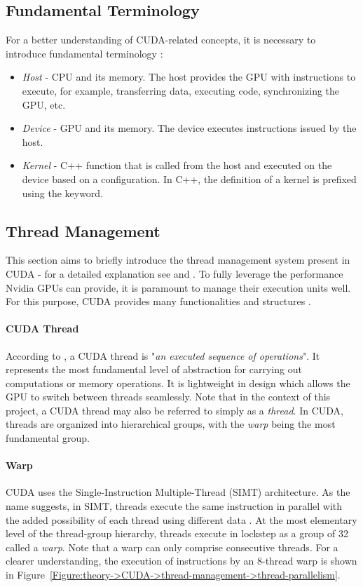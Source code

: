 \subsection{Fundamental Terminology}
For a better understanding of CUDA-related concepts, it is necessary to introduce fundamental terminology \cite{Ruetsch2008, Cejka2022}:
\begin{itemize}
	\item \textit{Host} - CPU and its memory.
The host provides the GPU with instructions to execute, for example, transferring data, executing code, synchronizing the GPU, etc.
	\item \textit{Device} - GPU and its memory.
The device executes instructions issued by the host.
	\item \textit{Kernel} - C++ function that is called from the host and executed on the device based on a configuration.
In C++, the definition of a kernel is prefixed using the  keyword.
\end{itemize}


\subsection{Thread Management}\label{Subsection:theory->CUDA->thread-management}
This section aims to briefly introduce the thread management system present in CUDA - for a detailed explanation see  \cite{Cejka2020} and  \cite{Cejka2022}.
To fully leverage the performance Nvidia GPUs can provide, it is paramount to manage their execution units well.
For this purpose, CUDA provides many functionalities and structures \cite{NVIDIADecember2022}.

\paragraph{CUDA Thread} According to  \cite{NVIDIADecember2022}, a CUDA thread is "\textit{an executed sequence of operations}".
It represents the most fundamental level of abstraction for carrying out computations or memory operations.
It is lightweight in design which allows the GPU to switch between threads seamlessly.
Note that in the context of this project, a CUDA thread may also be referred to simply as a \textit{thread}.
In CUDA, threads are organized into hierarchical groups, with the \textit{warp} being the most fundamental group.

\paragraph{Warp} CUDA uses the Single-Instruction Multiple-Thread (SIMT) architecture.
As the name suggests, in SIMT, threads execute the same instruction in parallel with the added possibility of each thread using different data \cite{xtprZzsTAPjyCsGX}.
At the most elementary level of the thread-group hierarchy, threads execute in lockstep as a group of 32 called a \textit{warp}.
Note that a warp can only comprise consecutive threads.
For a clearer understanding, the execution of instructions by an 8-thread warp is shown in Figure~\ref{Figure:theory->CUDA->thread-management->thread-parallelism}.

